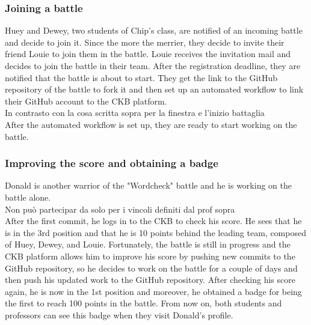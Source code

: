 \subsubsection{Joining a battle}
Huey and Dewey, two students of Chip's class, are notified of an incoming battle and decide to join it.
Since the more the merrier, they decide to invite their friend Louie to join them in the battle.
Louie receives the invitation mail and decides to join the battle in their team.
After the registration deadline, they are notified that the battle is about to start.
They get the link to the GitHub repository of the battle to fork it and then set up an automated workflow to link their GitHub account to the CKB platform.
\\ {\color{red} In contrasto con la cosa scritta sopra per la finestra e l'inizio battaglia} \\
After the automated workflow is set up, they are ready to start working on the battle.

\subsubsection{Improving the score and obtaining a badge}
Donald is another warrior of the "Wordcheck" battle and he is working on the battle alone.
\\ {\color{red} Non può partecipar da solo per i vincoli definiti dal prof sopra} \\ 
After the first commit, he logs in to the CKB to check his score.
He sees that he is in the 3rd position and that he is 10 points behind the leading team, composed of Huey, Dewey, and Louie.
Fortunately, the battle is still in progress and the CKB platform allows him to improve his score by pushing new commits to the GitHub repository, so he decides to work on the battle for a couple of days and then push his updated work to the GitHub repository.
After checking his score again, he is now in the 1st position and moreover, he obtained a badge for being the first to reach 100 points in the battle.
From now on, both students and professors can see this badge when they visit Donald's profile.

